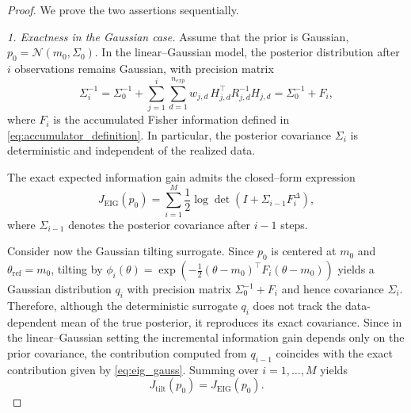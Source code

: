 \documentclass[10pt,a4paper]{amsart}
\begin{document}
\begin{proof}
We prove the two assertions sequentially.

\noindent\textit{1. Exactness in the Gaussian case.}
Assume that the prior is Gaussian, $p_0=\mathcal N(m_0,\Sigma_0)$.
In the linear--Gaussian model, the posterior distribution after $i$
observations remains Gaussian, with precision matrix
\[
\Sigma_i^{-1}
=
\Sigma_0^{-1}
+
\sum_{j=1}^{i}
\sum_{d=1}^{n_{exp}}
w_{j,d}\, H_{j,d}^\top R_{j,d}^{-1} H_{j,d}
=
\Sigma_0^{-1}+F_i,
\]
where $F_i$ is the accumulated Fisher information defined in \eqref{eq:accumulator_definition}.
In particular, the posterior covariance $\Sigma_i$ is deterministic and
independent of the realized data.

The exact expected information gain admits the closed--form expression
\begin{equation}\label{eq:eig_gauss}
J_{\mathrm{EIG}}(p_0)
=
\sum_{i=1}^M \frac12 \log \det\!\left(I + \Sigma_{i-1} F_i^\Delta \right),
\end{equation}
where $\Sigma_{i-1}$ denotes the posterior covariance after $i-1$ steps.

Consider now the Gaussian tilting surrogate. Since $p_0$ is centered at $m_0$ and
$\theta_{\mathrm{ref}}=m_0$, tilting by
\(
\phi_i(\theta)
=
\exp\!\left(-\tfrac12(\theta-m_0)^\top F_i(\theta-m_0)\right)
\)
yields a Gaussian distribution $q_i$ with precision matrix $\Sigma_0^{-1}+F_i$ and hence
covariance $\Sigma_i$. Therefore, although the deterministic surrogate $q_i$ does not track the
data-dependent mean of the true posterior, it reproduces its exact covariance.
Since in the linear--Gaussian setting the incremental information gain depends
only on the prior covariance, the contribution computed from $q_{i-1}$ coincides
with the exact contribution given by \eqref{eq:eig_gauss}. Summing over
$i=1,\dots,M$ yields
\[
J_{\mathrm{tilt}}(p_0)=J_{\mathrm{EIG}}(p_0).
\]

\medskip


\end{proof}
\end{document}
